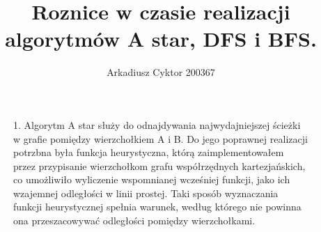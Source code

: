 \documentclass[a4paper,11pt]{report}
\title{Roznice w czasie realizacji algorytmów A star, DFS i BFS.}
\author{Arkadiusz Cyktor 200367}
\begin{document}
\maketitle

\begin{figure}
	1. Algorytm A star służy do odnajdywania najwydajniejszej ścieżki w grafie pomiędzy wierzchołkiem A i B. Do jego poprawnej realizacji potrzbna była funkcja heurystyczna, którą zaimplementowałem przez przypisanie wierzchołkom grafu współrzędnych kartezjańskich, co umożliwiło wyliczenie wspomnianej wcześniej funkcji, jako ich wzajemnej odległości w linii prostej. Taki sposób wyznaczania funkcji heurystycznej spełnia warunek, według którego nie powinna ona przeszacowywać odległości pomiędzy wierzchołkami. 
\end{figure}
\end{document}
